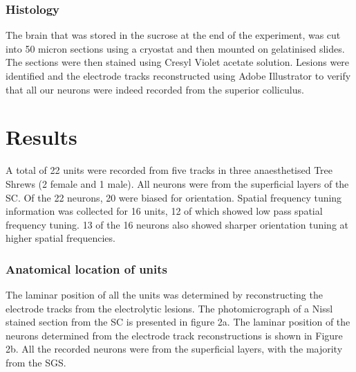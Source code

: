 	
	\subsubsection{Histology}
The brain that was stored in the sucrose at the end of the experiment,
was cut into 50 micron sections using a cryostat and then mounted on
gelatinised slides. The sections were then stained using Cresyl Violet
acetate solution. Lesions were identified and the electrode tracks
reconstructed using Adobe Illustrator to verify that all our neurons
were indeed recorded from the superior colliculus.
	
	\section{Results}
	
A total of 22 units were recorded from five tracks in three
anaesthetised Tree Shrews (2 female and 1 male). All neurons were from
the superficial layers of the SC. Of the 22 neurons, 20 were biased for
orientation. Spatial frequency tuning information was collected for 16
units, 12 of which showed low pass spatial frequency tuning. 13 of the
16 neurons also showed sharper orientation tuning at higher spatial
frequencies.
	
	
	\subsubsection{Anatomical location of units}
	
	The laminar position of all the units was determined by reconstructing
	the electrode tracks from the electrolytic lesions. The photomicrograph
	of a Nissl stained section from the SC is presented in figure 2a. The
	laminar position of the neurons determined from the electrode track
	reconstructions is shown in Figure 2b. All the recorded neurons were
	from the superficial layers, with the majority from the
	SGS.
		
